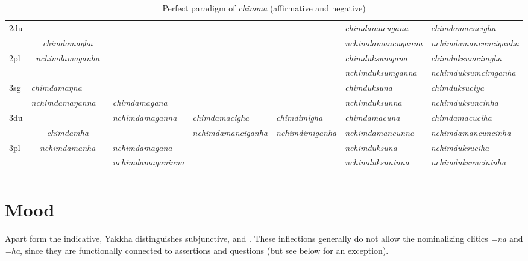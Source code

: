 \begin{sidewaystable}[p]
{\begin{tabular}{l|p{2.8cm}|p{1.6cm}|p{2.8cm}|p{3.0cm}|p{2.8cm}|p{3.2cm}|p{3.6cm}}
 \cline{1-2} \cline{7-8}			
{\sc 2du}		& \multicolumn{2}{c|}{}     & \multicolumn{3}{c|}{\cellcolor[gray]{.8}} & \it  chimdamacugana  & \it   chimdamacucigha \\
		& \multicolumn{2}{c|}{\it chimdamagha} & \multicolumn{3}{c|}{\cellcolor[gray]{.8} }& \it nchimdamancuganna  & \it  nchimdamancunciganha \\
 \cline{1-1} \cline{7-8}			
{\sc 2pl}		& \multicolumn{2}{c|}{\it nchimdamaganha} & \multicolumn{3}{c|}{\cellcolor[gray]{.8} }& \it  chimduksumgana& \it  chimduksumcimgha  \\
		& \multicolumn{2}{c|}{ }& \multicolumn{3}{c|}{ \cellcolor[gray]{.8}}& \it  nchimduksumganna & \it  nchimduksumcimganha \\
\hline			
{\sc 3sg} 		& \it chimdamaŋna	  & \it 	      	& \it   			& \it     & \it     	& \it chimduksuna& \it chimduksuciya\\
		& \it  nchimdamaŋanna   & \it    	& \it  chimdamagana	& \it   & \it    & \it nchimduksunna& \it nchimduksuncinha\\
  \cline{1-2}  \cline{7-8}					
{\sc 3du}&  \multicolumn{2}{c|}{}& \it nchimdamaganna& \it  chimdamacigha& \it chimdimigha& \it   chimdamacuna & \it   chimdamacuciha\\
	& \multicolumn{2}{c|}{\it chimdamha}& \it  & \it nchimdamanciganha& \it  nchimdimiganha & \it  nchimdamancunna & \it  nchimdamancuncinha\\
 \cline{1-1} \cline{4-4} \cline{7-8}	
{\sc 3pl} &  \multicolumn{2}{c|}{\it nchimdamanha}	& \it nchimdamagana& \it  & \it  & \it nchimduksuna& \it nchimduksuciha\\	
	&\multicolumn{2}{c|}{ }& \it nchimdamaganinna& \it & \it  & \it nchimduksuninna& \it nchimduksuncininha \\
\lspbottomrule
\end{tabular}
}
\caption{Perfect paradigm of \emph{chimma}  (affirmative and negative)}\label{par-chimd-prf}
\end{sidewaystable}



\section{Mood}\label{mood}

Apart form the indicative, Yakkha distinguishes subjunctive,  and   . These  inflections generally do not allow the nominalizing clitics \emph{=na} and \emph{=ha}, since they are functionally connected to assertions and questions (but see below for an exception).

